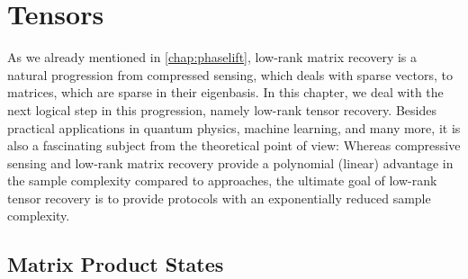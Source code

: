 \chapter{Tensors}
\label{chap:tensors}

As we already mentioned in \cref{chap:phaselift}, low-rank matrix recovery is a natural progression from compressed sensing, which deals with sparse vectors, to matrices, which are sparse in their eigenbasis.
In this chapter, we deal with the next logical step in this progression, namely low-rank tensor recovery.
Besides practical applications in quantum physics, machine learning, and many more, it is also a fascinating subject from the theoretical point of view:
Whereas compressive sensing and low-rank matrix recovery provide a polynomial (linear) advantage in the sample complexity compared to  approaches, the ultimate goal of low-rank tensor recovery is to provide protocols with an exponentially reduced sample complexity.


\section{Matrix Product States}
\label{sec:tensors.mps}

